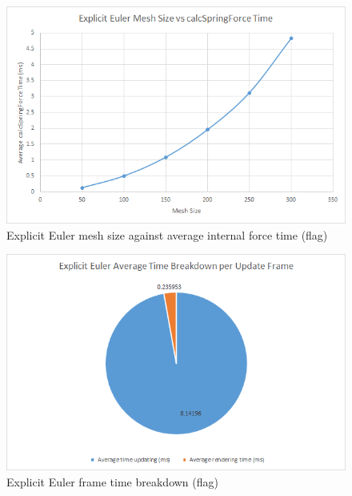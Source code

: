     \begin{figure}
    \begin{center}
      \includegraphics[scale=.9]{Figures/flag_ee_m_csf}
    \end{center}
    \caption{Explicit Euler mesh size against average internal force time (flag)}
    \label{fig:ee mesh csf flag}
  \end{figure}
  
    \begin{figure}
    \begin{center}
      \includegraphics[scale=.9]{Figures/flag_ee_ft}
    \end{center}
    \caption{Explicit Euler frame time breakdown (flag)}
    \label{fig:ee ft flag}
  \end{figure}
  
